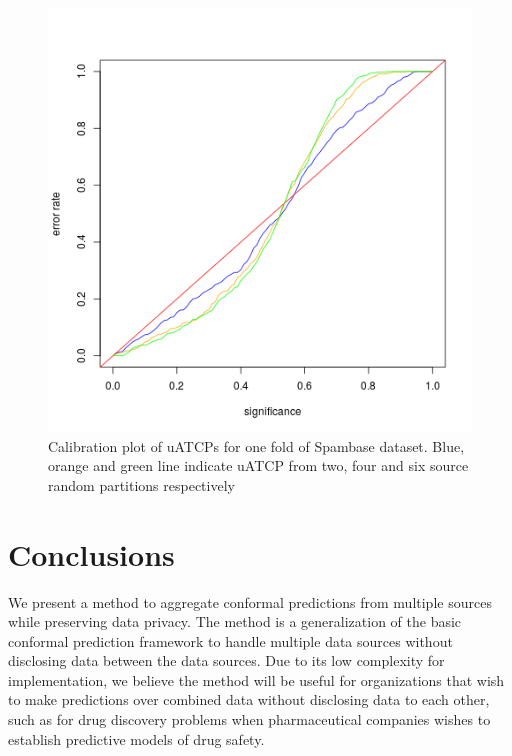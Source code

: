 \documentclass[main]{subfiles}
\begin{document}
\begin{figure}[H]
\begin{center}
  \includegraphics[scale=0.6]{images/eqSourceCombined}
 \caption{Calibration plot of uATCPs for one fold of Spambase dataset. Blue, orange and  green line indicate uATCP from two, four and six source random partitions respectively }\label{fig:valCombined}
\end{center}
\label{fig:uACP}
\end{figure}









\section{Conclusions}
We present a method to aggregate conformal predictions from multiple sources while preserving data privacy. The method is a generalization of the basic conformal prediction framework to handle multiple data sources without disclosing data between the data sources. Due to its low complexity for implementation, we believe the method will be useful for organizations that wish to make predictions over combined data without disclosing data to each other, such as for drug discovery problems when pharmaceutical companies wishes to establish predictive models of drug safety.
\end{document}
